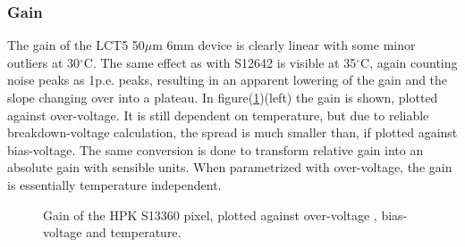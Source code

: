 \documentclass[12pt,article,type=msc,colorback,accentcolor=tud9c]{tudthesis}
\begin{document}
\subsubsection{Gain}


The gain of the LCT5 50$\mu$m 6mm device is clearly linear with some minor outliers at 30$^{\circ}$C.  The same effect as with S12642 is visible at 35$^{\circ}$C, again counting noise peaks as 1p.e. peaks, resulting in an apparent lowering of the gain and the slope changing over into a plateau. In figure(\ref{fig:S13360_Gain})(left) the gain is shown, plotted against over-voltage. It is still dependent on temperature, but due to reliable breakdown-voltage calculation, the spread is much smaller than, if plotted against bias-voltage. The same conversion is done to transform relative gain into an absolute gain with sensible units. When parametrized with over-voltage, the gain is essentially temperature independent.
\begin{figure}[h]
\begin{centering}
\caption[LCT5 6mm gain]{Gain of the HPK S13360 pixel, plotted against over-voltage , bias-voltage and temperature. }
\label{fig:S13360_Gain}
\end{centering}
\end{figure}
\end{document}
